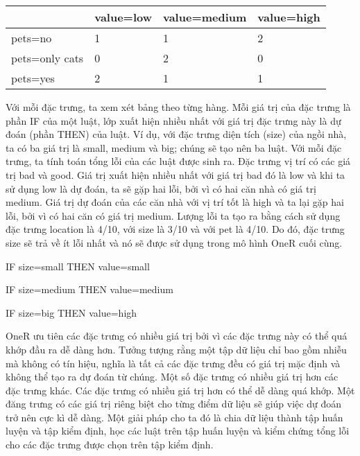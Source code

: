 \begin{table*}[hbt!]
\centering
\begin{tabular}{|l|l|l|l|}
\hline
               & \textbf{value=low} & \textbf{value=medium} & \textbf{value=high} \\ \hline
pets=no        & 1         & 1            & 2          \\ \hline
pets=only cats & 0         & 2            & 0          \\ \hline
pets=yes       & 2         & 1            & 1          \\ \hline
\end{tabular}
\end{table*}

Với mỗi đặc trưng, ta xem xét bảng theo từng hàng. Mỗi giá trị của đặc trưng là phần IF của một luật, lớp xuất hiện nhiều nhất với giá trị đặc trưng này là dự đoán (phần THEN) của luật. Ví dụ, với đặc trưng diện tích (size) của ngồi nhà, ta có ba giá trị là small, medium và big; chúng sẽ tạo nên ba luật.  Với mỗi đặc trưng, ta tính toán tổng lỗi của các luật được sinh ra. Đặc trưng vị trí có các giá trị bad và good. Giá trị xuất hiện nhiều nhất với giá trị bad đó là low và khi ta sử dụng low là dự đoán, ta sẽ gặp hai lỗi, bởi vì có hai căn nhà có giá trị medium. Giá trị dự đoán của các căn nhà với vị trí tốt là high và ta lại gặp hai lỗi, bởi vì có hai căn có giá trị medium. Lượng lỗi ta tạo ra bằng cách sử dụng đặc trưng location là 4/10, với size là 3/10 và với pet là 4/10. Do đó, đặc trưng size sẽ trả về ít lỗi nhất và nó sẽ được sử dụng trong mô hình OneR cuối cùng.

IF size=small THEN value=small

IF size=medium THEN value=medium

IF size=big THEN value=high

OneR ưu tiên các đặc trưng có nhiều giá trị bởi vì các đặc trưng này có thể quá khớp đầu ra dễ dàng hơn. Tưởng tượng rằng một tập dữ liệu chỉ bao gồm nhiễu mà không có tín hiệu, nghĩa là tất cả các đặc trưng đều có giá trị mặc định và không thể tạo ra dự đoán từ chúng. Một số đặc trưng có nhiều giá trị hơn các đặc trưng khác. Các đặc trưng có nhiều giá trị hơn có thể dễ dàng quá khớp. Một đăng trưng có các giá trị riêng biệt cho từng điểm dữ liệu sẽ giúp việc dự đoán trở nên cực kì dễ dàng. Một giải pháp cho ta đó là chia dữ liệu thành tập huấn luyện và tập kiểm định, học các luật trên tập huấn luyện và kiểm chứng tổng lỗi cho các đặc trưng được chọn trên tập kiểm định.

